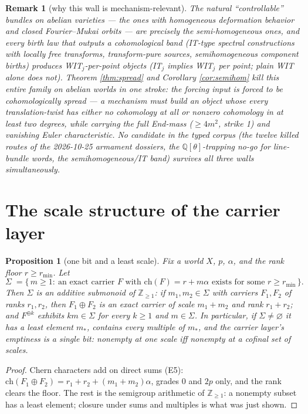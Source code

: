 \documentclass[11pt]{article}
\newtheorem{proposition}{Proposition}
\newtheorem{remark}{Remark}
\begin{document}
\begin{remark}[why this wall is mechanism-relevant]
The natural ``controllable'' bundles on abelian varieties --- the ones with homogeneous deformation
behavior and closed Fourier--Mukai orbits --- are precisely the semi-homogeneous ones, and every birth
law that outputs a cohomological band (IT-type spectral constructions with locally free transforms,
transform-pure sources,
semihomogeneous component births) produces WIT$_j$-per-point objects (IT$_j$ implies WIT$_j$ per point;
plain WIT alone does not). Theorem \ref{thm:spread} and
Corollary \ref{cor:semihom} kill this entire family on abelian worlds in one stroke: the forcing input
is \emph{forced to be cohomologically spread} --- a mechanism must build an object whose every
translation-twist has either no cohomology at all or nonzero cohomology in at least two degrees, while carrying the
full End-mass ($\ge4m^2$, strike 1) and vanishing Euler characteristic. No candidate in the typed
corpus (the twelve killed routes of the 2026-10-25 armament dossiers, the $\mathbb{Q}[\theta]$-trapping
no-go for line-bundle words, the semihomogeneous/IT band) survives all three walls simultaneously.
\end{remark}

\section{The scale structure of the carrier layer}\label{sec:scale}

\begin{proposition}[one bit and a least scale]\label{prop:scale}
Fix a world $X$, $p$, $\alpha$, and the rank floor $r\ge r_{\min}$. Let
\[
\Sigma\;=\{\,m\ge1:\ \text{an exact carrier }F\text{ with }\mathrm{ch}(F)=r+m\alpha\text{ exists for some }r\ge r_{\min}\,\}.
\]
Then $\Sigma$ is an additive submonoid of $\mathbb{Z}_{\ge1}$: if $m_1,m_2\in\Sigma$ with carriers
$F_1,F_2$ of ranks $r_1,r_2$, then $F_1\oplus F_2$ is an exact carrier of scale $m_1+m_2$ and rank
$r_1+r_2$; and $F^{\oplus k}$ exhibits $km\in\Sigma$ for every $k\ge1$ and $m\in\Sigma$. In particular,
if $\Sigma\ne\varnothing$ it has a least element $m_\ast$, contains every multiple of $m_\ast$, and the
carrier layer's emptiness is a single bit: \emph{nonempty at one scale iff nonempty at a cofinal set of
scales}.
\end{proposition}

\begin{proof}
Chern characters add on direct sums (E5): $\mathrm{ch}(F_1\oplus F_2)=r_1+r_2+(m_1+m_2)\alpha$, grades
$0$ and $2p$ only, and the rank clears the floor. The rest is the semigroup arithmetic of
$\mathbb{Z}_{\ge1}$: a nonempty subset has a least element; closure under sums and multiples is what was
just shown.
\end{proof}
\end{document}
